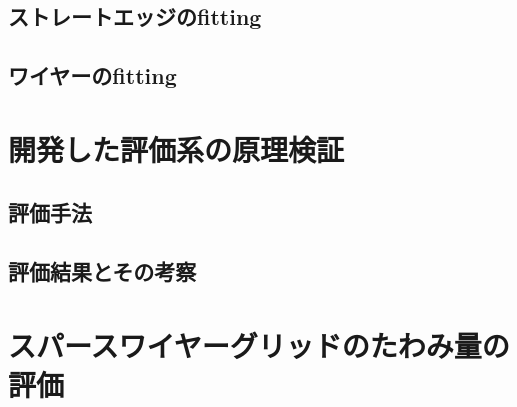 \documentclass[../../main.tex]{subfiles}
\begin{document}
\subsection{ストレートエッジのfitting}
\subsection{ワイヤーのfitting}

\section{開発した評価系の原理検証}
\subsection{評価手法}
\subsection{評価結果とその考察}

\section{スパースワイヤーグリッドのたわみ量の評価}
\end{document}
